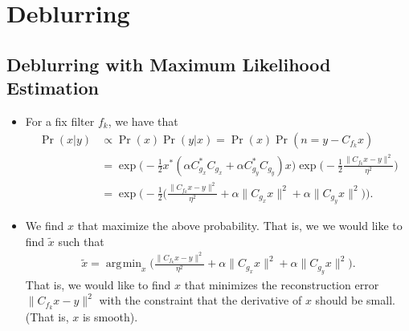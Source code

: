 \documentclass[10pt]{article}
\DeclareMathOperator*{\argmin}{\arg\!\min}
\begin{document}

\section{Deblurring}\label{sec:deblurring} %

\subsection{Deblurring with Maximum Likelihood Estimation}

\begin{itemize}
  \item For a fix filter $f_k$, we have that
  \begin{align*}
    \Pr(x | y) &\propto \Pr(x) \Pr(y|x) = \Pr(x) \Pr(n = y -C_{f_k}x)\\
    &= \exp\bigg(-\frac{1}{2} x^* (\alpha C_{g_x}^* C_{g_x} + \alpha C_{g_y}^* C_{g_y} ) x\bigg) \exp \bigg( -\frac{1}{2} \frac{\| C_{f_k} x - y \|^2}{\eta^2} \bigg)\\
    &= \exp\bigg(-\frac{1}{2}\bigg( \frac{\| C_{f_k} x - y \|^2}{\eta^2} + \alpha \| C_{g_x} x \|^2 + \alpha \| C_{g_y} x \|^2 \bigg) \bigg).
  \end{align*}
  
  \item We find $x$ that maximize the above probability. That is, we we would like to find $\tilde{x}$ such that
  \begin{align*}
    \tilde{x} = \argmin_{x} \bigg( \frac{\| C_{f_k} x - y \|^2}{\eta^2} + \alpha \| C_{g_x} x \|^2 + \alpha \| C_{g_y} x \|^2 \bigg).
  \end{align*}
  That is, we would like to find $x$ that minimizes the reconstruction error $\| C_{f_k} x - y \|^2$ with the constraint that the derivative of $x$ should be small. (That is, $x$ is smooth).
  

\end{itemize}
\end{document}
